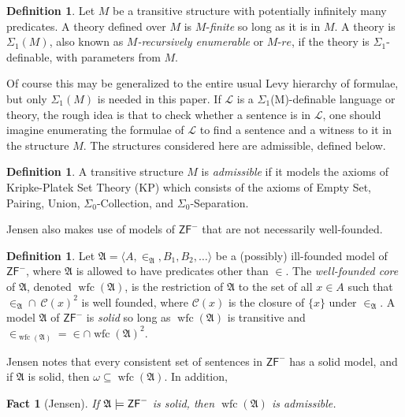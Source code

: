 \documentclass{amsart}
\newtheorem{fact}[theorem]{Fact}
\theoremstyle{definition}
\newtheorem{definition}[theorem]{Definition}
\theoremstyle{remark}
\DeclareMathOperator{\wfc}{wfc}
\begin{document}
\begin{definition} Let $M$ be a transitive structure with potentially infinitely many predicates. A theory defined over $M$ is $M$-\emph{finite} so long as it is in $M$. A theory is $\Sigma_1(M)$, also known as \emph{$M$-recursively enumerable} or $M$-$re$, if the theory is $\Sigma_1$-definable, with parameters from $M$. \end{definition}
Of course this may be generalized to the entire usual Levy hierarchy of formulae, but only $\Sigma_1(M)$ is needed in this paper. If $\mathcal L$ is a $\Sigma_1$(M)-definable language or theory, the rough idea is that to check whether a sentence is in $\mathcal L$, one should imagine enumerating the formulae of $\mathcal L$ to find a sentence and a witness to it in the structure $M$. The structures considered here are admissible, defined below.

\begin{definition} A transitive structure $M$ is \emph{admissible} if it models the axioms of \textsf{Kripke-Platek Set Theory} (\textsf{KP}) which consists of the axioms of \textsf{Empty Set}, \textsf{Pairing}, \textsf{Union}, $\Sigma_0$-\textsf{Collection}, and $\Sigma_0$-\textsf{Separation}. \end{definition}

Jensen also makes use of models of $\textsf{ZF}^-$ that are not necessarily well-founded.
\begin{definition} Let $\mathfrak A = \langle A, \in_{\mathfrak A}, B_1, B_2, \dots \rangle$ be a (possibly) ill-founded model  of $\textsf{ZF}^-$, where $\mathfrak A$ is allowed to have predicates other than $\in$. The \emph{well-founded core} of $\mathfrak A$, denoted $\wfc(\mathfrak A)$, is the restriction of $\mathfrak A$ to the set of all $x \in A$ such that $\in_{\mathfrak A} \cap \ \mathcal C(x)^2$ is well founded, where $\mathcal C(x)$ is the closure of $\{x\}$ under $\in_{\mathfrak A}$. A model $\mathfrak A$ of $\textsf{ZF}^-$ is \emph{solid} so long as $\wfc(\mathfrak A)$ is transitive and $\in_{\wfc(\mathfrak A)}=\in \cap \wfc(\mathfrak A)^2$. \end{definition}

Jensen \cite[Section 1.2]{Jensen:2012fr} notes that every consistent set of sentences in $\textsf{ZF}^-$ has a solid model, and if $\mathfrak A$ is solid, then $\omega \subseteq \wfc(\mathfrak A)$. In addition,

\begin{fact}[Jensen] If $\mathfrak A \models \textsf{\textup{ZF}}^-$ is solid, then $\wfc(\mathfrak A)$ is admissible. \end{fact}
\end{document}
